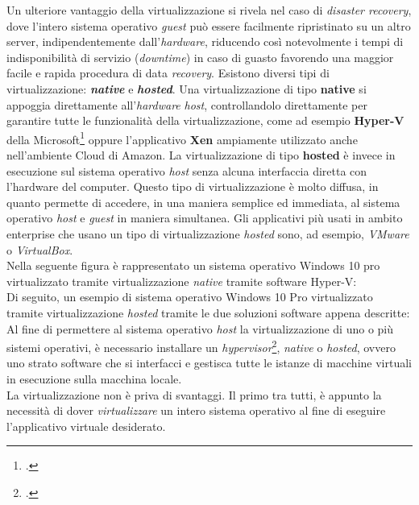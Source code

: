 Un ulteriore vantaggio della virtualizzazione si rivela nel caso di \textit{\gls{disaster recovery}}, dove l'intero sistema operativo \textit{guest} può essere facilmente ripristinato su un altro server, indipendentemente dall'\textit{hardware}, riducendo così notevolmente i tempi di indisponibilità di servizio (\textit{downtime}) in caso di guasto favorendo una maggior facile e rapida procedura di data \textit{\gls{recovery}}.
Esistono diversi tipi di virtualizzazione: \textbf{\textit{native}} e \textbf{\textit{hosted}}.
Una virtualizzazione di tipo \textbf{native} si appoggia direttamente all'\textit{hardware} \textit{host}, controllandolo direttamente per garantire tutte le funzionalità della virtualizzazione, come ad esempio \textbf{\gls{Hyper-V}} della Microsoft\footcite{questa funzionalita' e' presente solamente nelle versioni Pro e Server di Windows 10} oppure l'applicativo \textbf{\gls{Xen}} ampiamente utilizzato anche nell'ambiente Cloud di Amazon.
La virtualizzazione di tipo \textbf{hosted} è invece in esecuzione sul sistema operativo \textit{host} senza alcuna interfaccia diretta con l'hardware del computer. Questo tipo di virtualizzazione è molto diffusa, in quanto permette di accedere, in una maniera semplice ed immediata, al sistema operativo \textit{host} e \textit{guest} in maniera simultanea. Gli applicativi più usati in ambito enterprise che usano un tipo di virtualizzazione \textit{hosted} sono, ad esempio, \textit{VMware} o \textit{VirtualBox}.\\
Nella seguente figura è rappresentato un sistema operativo Windows 10 pro virtualizzato tramite virtualizzazione \textit{native} tramite software Hyper-V:
\\Di seguito, un esempio di sistema operativo Windows 10 Pro virtualizzato tramite virtualizzazione \textit{hosted} tramite le due soluzioni software appena descritte:
\\Al fine di permettere al sistema operativo \textit{host} la virtualizzazione di uno o più sistemi operativi, è necessario installare un \textit{\gls{hypervisor}}\footcite{installabile solamente se il processore supporta la virtualizzazione e se quest'ultima e' abilitata da BIOS}, \textit{native} o \textit{hosted}, ovvero uno strato software che si interfacci e gestisca tutte le istanze di macchine virtuali in esecuzione sulla macchina locale. 
\\La virtualizzazione non è priva di svantaggi. Il primo tra tutti, è appunto la necessità di dover \textit{virtualizzare} un intero sistema operativo al fine di eseguire l'applicativo virtuale desiderato.
